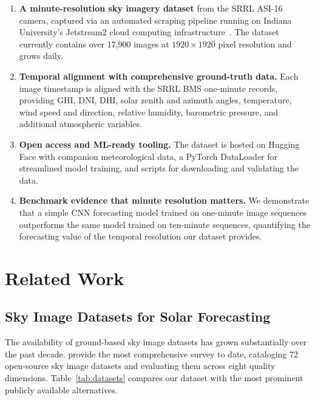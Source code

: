 \documentclass[twoside,11pt]{article}
\begin{document}
\begin{enumerate}
    \item \textbf{A minute-resolution sky imagery dataset} from the SRRL ASI-16 camera, captured via an automated scraping pipeline running on Indiana University's Jetstream2 cloud computing infrastructure~\citep{hancock2021jetstream2}. The dataset currently contains over 17,900 images at $1920 \times 1920$ pixel resolution and grows daily.
    \item \textbf{Temporal alignment with comprehensive ground-truth data.} Each image timestamp is aligned with the SRRL BMS one-minute records, providing GHI, DNI, DHI, solar zenith and azimuth angles, temperature, wind speed and direction, relative humidity, barometric pressure, and additional atmospheric variables.
    \item \textbf{Open access and ML-ready tooling.} The dataset is hosted on Hugging Face with companion meteorological data, a PyTorch DataLoader for streamlined model training, and scripts for downloading and validating the data.
    \item \textbf{Benchmark evidence that minute resolution matters.} We demonstrate that a simple CNN forecasting model trained on one-minute image sequences outperforms the same model trained on ten-minute sequences, quantifying the forecasting value of the temporal resolution our dataset provides.
\end{enumerate}

\section{Related Work}
\label{sec:related}

\subsection{Sky Image Datasets for Solar Forecasting}

The availability of ground-based sky image datasets has grown substantially over the past decade. \citet{nie2024survey} provide the most comprehensive survey to date, cataloging 72 open-source sky image datasets and evaluating them across eight quality dimensions. Table~\ref{tab:datasets} compares our dataset with the most prominent publicly available alternatives.
\end{document}
